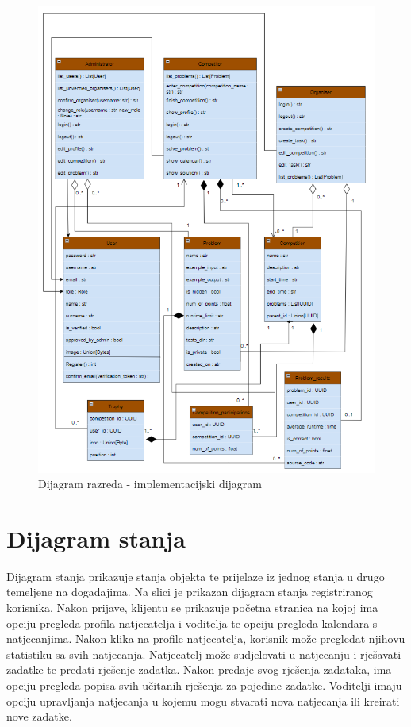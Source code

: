 			\begin{figure}[H]
				\includegraphics[width=\linewidth]{slike/ImplementacijskiDijagramRazreda}
				\centering
				\caption{Dijagram razreda - implementacijski dijagram}
				\label{fig:implementacija4}
			\end{figure}
			
			\eject
		
		\section{Dijagram stanja}

			Dijagram stanja prikazuje stanja objekta te prijelaze iz jednog stanja u drugo temeljene na događajima.
			Na slici je prikazan dijagram stanja registriranog korisnika.
			Nakon prijave, klijentu se prikazuje početna stranica na kojoj ima opciju pregleda profila natjecatelja i voditelja te opciju pregleda kalendara s natjecanjima. Nakon klika na profile natjecatelja, korisnik može pregledat njihovu statistiku sa svih natjecanja. 
			Natjecatelj može sudjelovati u natjecanju i rješavati zadatke te predati rješenje zadatka. Nakon predaje svog rješenja zadataka, ima opciju pregleda popisa svih učitanih rješenja za pojedine zadatke.
			Voditelji imaju opciju upravljanja natjecanja u kojemu mogu stvarati nova natjecanja ili kreirati nove zadatke.
			\eject
				
